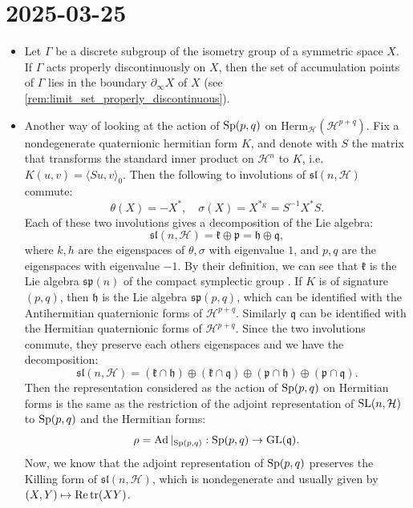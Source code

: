 \documentclass{report}
\begin{document}
\section{2025-03-25}
\begin{itemize}
    \item Let $\Gamma$ be a discrete subgroup of the isometry group of a symmetric space $X$.
    If $\Gamma$ acts properly discontinuously on $X$, then the set of accumulation points of $\Gamma$ lies in the boundary $\partial_\infty X$ of $X$ (see \cref{rem:limit_set_properly_discontinuous}).
    \item Another way of looking at the action of $\operatorname{{\mathrm{Sp}}}(p,q)$ on $\mathrm{Herm}_\mathcal H (\mathcal H^{p+q})$.
    Fix a nondegenerate quaternionic hermitian form $K$, and denote with $S$ the matrix that transforms the standard inner product on $\mathcal H^n$ to $K$, i.e.\ $K(u,v) = \langle Su, v \rangle_0$.
    Then the following to involutions of $\mathfrak{sl}(n, \mathcal H)$ commute:
    \[
    \theta(X) = -X^*, \quad \sigma(X) = X^{*_K} = S^{-1} X^* S.
    \]
    Each of these two involutions gives a decomposition of the Lie algebra:
    \[
    \mathfrak{sl}(n, \mathcal H) = \mathfrak k \oplus \mathfrak p = \mathfrak h \oplus \mathfrak q,
    \]
    where $k, h$ are the eigenspaces of $\theta, \sigma$ with eigenvalue $1$, and $p, q$ are the eigenspaces with eigenvalue $-1$.
    By their definition, we can see that $\mathfrak k$ is the Lie algebra $\mathfrak{sp}(n)$ of the compact symplectic group .
    If $K$ is of signature $(p,q)$, then $\mathfrak h$ is the Lie algebra $\mathfrak{sp}(p,q)$, which can be identified with the Antihermitian quaternionic forms of $\mathcal H^{p+q}$.
    Similarly $\mathfrak q$ can be identified with the Hermitian quaternionic forms of $\mathcal H^{p+q}$.
    Since the two involutions commute, they preserve each others eigenspaces and we have the decomposition:
    \[
    \mathfrak{sl}(n, \mathcal H) = (\mathfrak k \cap \mathfrak h) \oplus (\mathfrak k \cap \mathfrak q) \oplus (\mathfrak p \cap \mathfrak h) \oplus (\mathfrak p \cap \mathfrak q).
    \]
    Then the representation considered as the action of $\operatorname{{\mathrm{Sp}}}(p,q)$ on Hermitian forms is the same as the restriction of the adjoint representation of $\operatorname{{\mathrm{SL}}}(n, \mathcal H)$ to $\operatorname{{\mathrm{Sp}}}(p,q)$ and the Hermitian forms:
    \[
    \rho = \operatorname{Ad}|_{\operatorname{{\mathrm{Sp}}}(p,q)}: \operatorname{{\mathrm{Sp}}}(p,q) \to \operatorname{{\mathrm{GL}}}(\mathfrak q).
    \]
    Now, we know that the adjoint representation of $\operatorname{{\mathrm{Sp}}}(p,q)$ preserves the Killing form of $\mathfrak{sl}(n, \mathcal H)$, which is nondegenerate and usually given by $(X,Y) \mapsto \mathrm{Re}\operatorname{tr}(XY)$.

\end{itemize}
\end{document}
